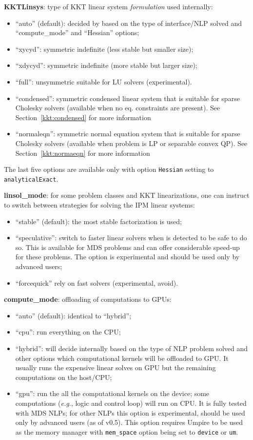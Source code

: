 \noindent \textbf{KKTLinsys}: type of KKT linear system \textit{formulation} used internally:
\begin{itemize}
\item ``auto'' (default): decided by \Hi based on the type of interface/NLP solved and ``compute\_mode'' and ``Hessian'' options;
\item ``xycyd'': symmetric indefinite (less stable but smaller size);
\item ``xdycyd'': symmetric indefinite (more stable but  larger size);
\item  ``full'': unsymmetric suitable for LU solvers (experimental).
\item  ``condensed'': symmetric condensed linear system that is suitable for sparse Cholesky solvers (available when no eq. constraints are present). See Section~\ref{kkt:condensed} for more information
\item  ``normaleqn'': symmetric normal equation system that is suitable for sparse Cholesky solvers (available when problem is LP or separable convex QP). See Section~\ref{kkt:normaeqn} for more information
\end{itemize}
The last five options are available only with option \texttt{Hessian} setting to \texttt{analyticalExact}.
\medskip

\noindent \textbf{linsol\_mode}: for some problem classes and KKT linearizations, one can instruct \Hi to switch between strategies for solving the IPM linear systems:
\begin{itemize}
\item ``stable'' (default): the most stable factorization is used;
\item ``speculative'': switch to faster linear solvers when is detected to be safe to do so. This is available for MDS problems and can offer considerable speed-up for these problems. The option is experimental and should be used only by advanced users;
\item ``forcequick'' rely on fast solvers (experimental, avoid).
\end{itemize}
\medskip

\noindent \textbf{compute\_mode}: offloading of computations to GPUs:
\begin{itemize}
\item ``auto'' (default): identical to ``hybrid'';
\item ``cpu'': run everything on the CPU;
\item ``hybrid'':  \Hi will decide internally based on the type of NLP problem solved and other options which computational kernels will be offloaded to GPU. It usually runs the expensive linear solves on GPU but the remaining computations on the host/CPU;
\item ``gpu'': run the all the computational kernels on the device; some computations (\textit{e.g.}, logic and control loop) will run on CPU. It is fully tested with MDS NLPs; for other NLPs this option is experimental, should be used only by advanced users (as of v0.5). This option requires Umpire to be used as the memory manager with \texttt{mem\_space} option being set to \texttt{device} or \texttt{um}.
\end{itemize}
\medskip

